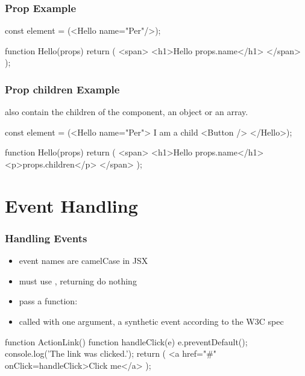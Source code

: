 \begin{frame}[fragile] \frametitle{Prop Example}

\begin{CodeBox}{}
const element = (<Hello name="Per"/>);

function Hello(props) {
  return (
    <span>
      <h1>Hello {props.name}</h1>
    </span>
  );
}
\end{CodeBox}
\end{frame}

\begin{frame}[fragile] \frametitle{Prop children Example}
 also contain the children of the component, an object or an array.
\begin{CodeBox}{}
const element = 
(<Hello name="Per">
  I am a child <Button />
</Hello>);

function Hello(props) {
  return (
    <span>
      <h1>Hello {props.name}</h1>
      <p>{props.children}</p>
    </span>
  );
}
\end{CodeBox}
\end{frame}
\section{Event Handling}
\begin{frame}[fragile] \frametitle{Handling Events}
\begin{itemize}
  \item event names are camelCase in JSX
  \item must use , returning  do nothing
  \item pass a function: 
  \item called with one argument, a synthetic event according to the W3C spec
\end{itemize}
\begin{CodeBox}{}
function ActionLink() {
  function handleClick(e) {
    e.preventDefault();
    console.log('The link was clicked.');
  }
  return (
    <a href="#" onClick={handleClick}>Click me</a>
  );
}
\end{CodeBox}
\end{frame}

